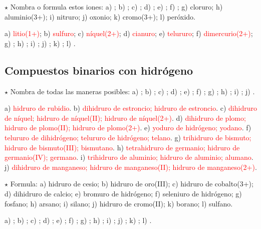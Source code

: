 \begin{exercise}
    \(\star\) Nombra o formula estos iones: a) ; b) ; c) ; d) ; e) ; f) ;
    g) cloruro; h) aluminio(3+); i) nitruro; j) oxonio; k) cromo(3+); l) peróxido.
    \begin{solu}
        a) \textcolor{red}{litio(1+)}; b) \textcolor{red}{sulfuro}; c) \textcolor{red}{níquel(2+)}; d) \textcolor{red}{cianuro};
        e) \textcolor{red}{telururo}; f) \textcolor{red}{dimercurio(2+)}; g) \textcolor{red}{}; h)
        \textcolor{red}{}; i) \textcolor{red}{}; j) \textcolor{red}{}; k) \textcolor{red}{};
        l) \textcolor{red}{}.
    \end{solu}
\end{exercise}

\subsection{Compuestos binarios con hidrógeno}

\begin{exercise}
    \(\star\) Nombra de todas las maneras posibles: a) ; b) ; c) ; d) ; e) ; f)
    ; g) ; h) ; i) ; j) .
    \begin{solu}
        a) \textcolor{red}{hidruro de rubidio}. b) \textcolor{red}{dihidruro de estroncio; hidruro de estroncio}. c)
        \textcolor{red}{dihidruro de níquel; hidruro de níquel(II); hidruro de níquel(2+)}. d) \textcolor{red}{dihidruro de plomo;
        hidruro de plomo(II); hidruro de plomo(2+)}. e) \textcolor{red}{yoduro de hidrógeno; yodano}. f) \textcolor{red}{telururo
        de dihidrógeno; telururo de hidrógeno; telano}. g) \textcolor{red}{trihidruro de bismuto; hidruro de bismuto(III);
        bismutano}. h) \textcolor{red}{tetrahidruro de germanio; hidruro de germanio(IV); germano}. i) \textcolor{red}{trihidruro
        de aluminio; hidruro de aluminio; alumano}. j) \textcolor{red}{dihidruro de manganeso; hidruro de manganeso(II); hidruro
        de manganeso(2+)}.
    \end{solu}
\end{exercise}

\begin{exercise}
    \(\star\) Formula: a) hidruro de cesio; b) hidruro de oro(III); c) hidruro de cobalto(3+); d) dihidruro de calcio; e) bromuro
    de hidrógeno; f) seleniuro de hidrógeno; g) fosfano; h) arsano; i) silano; j) hidruro de cromo(II); k) borano; l) sulfano.
    \begin{solu}
        a) \textcolor{red}{}; b) \textcolor{red}{}; c) \textcolor{red}{}; d) \textcolor{red}{};
        e) \textcolor{red}{}; f) \textcolor{red}{}; g) \textcolor{red}{}; h) \textcolor{red}{};
        i) \textcolor{red}{}; j) \textcolor{red}{}; k) \textcolor{red}{}; l) \textcolor{red}{}.
    \end{solu}
\end{exercise}


